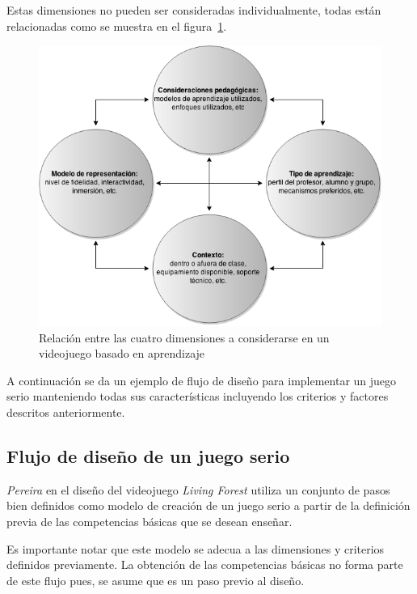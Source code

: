 Estas dimensiones no pueden ser consideradas individualmente, todas están
relacionadas  como se muestra en el figura~\ref{fig:desarrollo_dimensiones}.

\begin{figure}[H]
\centering
\includegraphics[scale=0.5]{juegos_serios/desarrollo_dimensiones.png}
\caption{Relación entre las cuatro dimensiones a considerarse en un videojuego
    basado en aprendizaje}
\label{fig:desarrollo_dimensiones}
\end{figure}

A continuación se da un ejemplo de flujo de diseño para implementar un juego serio 
manteniendo todas sus características incluyendo los criterios y factores descritos 
anteriormente.

\subsection{Flujo de diseño de un juego serio}

\textit{Pereira}\cite{pereira2009design} en el diseño del videojuego \emph{Living
    Forest} utiliza un conjunto de pasos bien definidos como modelo de creación
de un juego serio a partir de la definición previa de las competencias básicas
que se desean enseñar.

Es importante notar que este modelo se adecua a las dimensiones y criterios
definidos previamente. La obtención de las competencias básicas no forma parte
de este flujo pues, se asume que es un paso previo al diseño.


